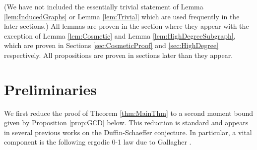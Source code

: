 \documentclass[12pt]{amsart}
\numberwithin{equation}{section}
\theoremstyle{definition}
\theoremstyle{remark}
\begin{document}
\begin{center}
{{\begin{center}
\end{center}}}
   \end{center}

%
%

\smallskip

(We have not included the essentially trivial statement of Lemma \ref{lem:InducedGraphs} or Lemma \ref{lem:Trivial} which are used frequently in the later sections.) All lemmas are proven in the section where they appear with the exception of Lemma \ref{lem:Cosmetic} and Lemma \ref{lem:HighDegreeSubgraph}, which are proven in Sections \ref{sec:CosmeticProof} and \ref{sec:HighDegree} respectively. All propositions are proven in sections later than they appear.


\section{Preliminaries}\label{sec:Prelim}

We first reduce the proof of Theorem \ref{thm:MainThm} to a second moment bound given by Proposition \ref{prop:GCD} below. This reduction is standard and appears in several previous works on the Duffin-Schaeffer conjecture. In particular, a vital component is the following ergodic 0-1 law due to Gallagher \cite{gallagher}.
\end{document}

